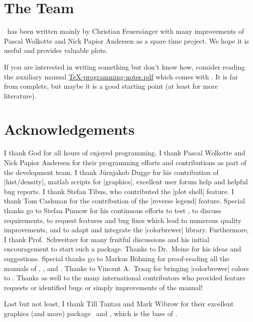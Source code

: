 \section{The Team}
\PGFPlots\ has been written mainly by Christian Feuers\"anger with many improvements of Pascal Wolkotte and Nick Papior Andersen as a spare time project. We hope it is useful and provides valuable plots.

If you are interested in writing something but don't know how, consider reading the auxiliary manual \href{file:TeX-programming-notes.pdf}{TeX-programming-notes.pdf} which comes with \PGFPlots. It is far from complete, but maybe it is a good starting point (at least for more literature).

\section{Acknowledgements}
I thank God for all hours of enjoyed programming. I thank Pascal Wolkotte and Nick Papior Andersen for their programming efforts and contributions as part of the development team. I thank J\"urnjakob Dugge for his contribution of |hist/density|, matlab scripts for  |graphics|, excellent user forum help and helpful bug reports. I thank Stefan Tibus, who contributed the |plot shell| feature. I thank Tom Cashman for the contribution of the |reverse legend| feature. Special thanks go to Stefan Pinnow for his continuous efforts to test \PGFPlots, to discuss requirements, to request features and bug fixes which lead to numerous quality improvements, and to adapt and integrate the |colorbrewer| library. Furthermore, I thank Prof.~Schweitzer for many fruitful discussions and his initial encouragement to start such a package. Thanks to Dr.~Meine for his ideas and suggestions. Special thanks go to Markus B\"ohning for proof-reading all the manuals of \PGF, \PGFPlots, and \PGFPlotstable. Thanks to Vincent A.\ Traag for bringing |colorbrewer| colors to \PGFPlots. Thanks as well to the many international contributors who provided feature requests or identified bugs or simply improvements of the manual!

Last but not least, I thank Till Tantau and Mark Wibrow for their excellent graphics (and more) package \PGF\ and \Tikz, which is the base of \PGFPlots.



